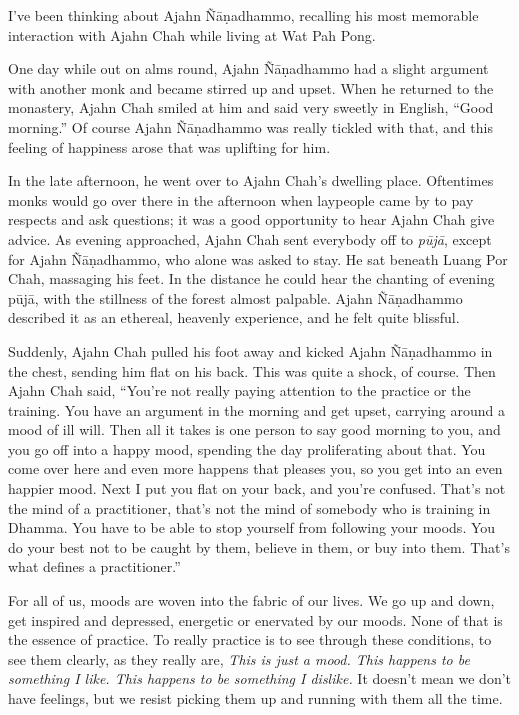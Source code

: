 
I've been thinking about Ajahn Ñāṇadhammo, recalling his most 
memorable interaction with Ajahn Chah while living at Wat Pah Pong.

One day while out on alms round, Ajahn Ñāṇadhammo had a slight 
argument with another monk and became stirred up and upset. When he 
returned to the monastery, Ajahn Chah smiled at him and said very 
sweetly in English, ``Good morning.'' Of course Ajahn Ñāṇadhammo 
was really tickled with that, and this feeling of happiness arose that 
was uplifting for him.

In the late afternoon, he went over to Ajahn Chah's dwelling place. 
Oftentimes monks would go over there in the afternoon when laypeople 
came by to pay respects and ask questions; it was a good opportunity to 
hear Ajahn Chah give advice. As evening approached, Ajahn Chah sent 
everybody off to \emph{pūjā}, except for Ajahn Ñāṇadhammo, who 
alone was asked to stay. He sat beneath Luang Por Chah, massaging his 
feet. In the distance he could hear the chanting of evening pūjā, 
with the stillness of the forest almost palpable. Ajahn Ñāṇadhammo 
described it as an ethereal, heavenly experience, and he felt quite 
blissful.

Suddenly, Ajahn Chah pulled his foot away and kicked Ajahn 
Ñāṇadhammo in the chest, sending him flat on his back. This was 
quite a shock, of course. Then Ajahn Chah said, ``You're not really 
paying attention to the practice or the training. You have an argument 
in the morning and get upset, carrying around a mood of ill will. Then 
all it takes is one person to say good morning to you, and you go off 
into a happy mood, spending the day proliferating about that. You come 
over here and even more happens that pleases you, so you get into an 
even happier mood. Next I put you flat on your back, and you're 
confused. That's not the mind of a practitioner, that's not the mind of 
somebody who is training in Dhamma. You have to be able to stop 
yourself from following your moods. You do your best not to be caught 
by them, believe in them, or buy into them. That's what defines a 
practitioner.''

For all of us, moods are woven into the fabric of our lives. We go up 
and down, get inspired and depressed, energetic or enervated by our 
moods. None of that is the essence of practice. To really practice is 
to see through these conditions, to see them clearly, as they really 
are, \emph{This is just a mood. This happens to be something I like. 
This happens to be something I dislike.} It doesn't mean we don't have 
feelings, but we resist picking them up and running with them all the 
time.

